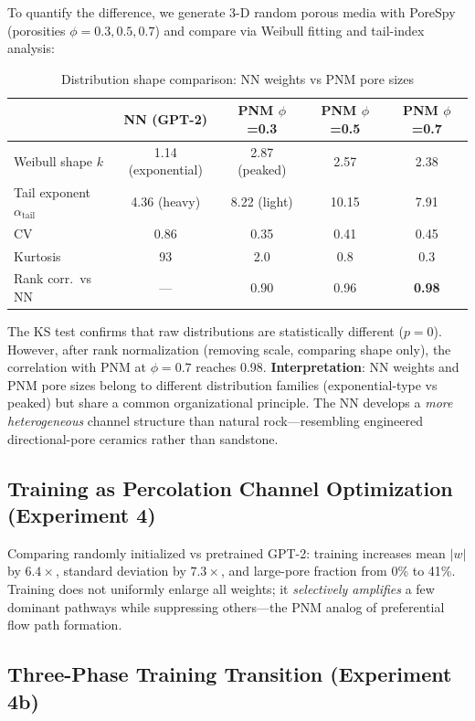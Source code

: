 \documentclass[11pt,a4paper]{article}
\begin{document}
To quantify the difference, we generate 3-D random porous media with
PoreSpy (porosities $\phi=0.3,0.5,0.7$) and compare via Weibull fitting
and tail-index analysis:

\begin{table}[H]
\centering
\caption{Distribution shape comparison: NN weights vs PNM pore sizes}
\label{tab:mis-shape}
\small
\begin{tabular}{lcccc}
\toprule
 & \textbf{NN (GPT-2)} & \textbf{PNM $\phi$=0.3} & \textbf{PNM $\phi$=0.5} & \textbf{PNM $\phi$=0.7} \\
\midrule
Weibull shape $k$ & 1.14 (exponential) & 2.87 (peaked) & 2.57 & 2.38 \\
Tail exponent $\alpha_{\text{tail}}$ & 4.36 (heavy) & 8.22 (light) & 10.15 & 7.91 \\
CV & 0.86 & 0.35 & 0.41 & 0.45 \\
Kurtosis & 93 & 2.0 & 0.8 & 0.3 \\
Rank corr.\ vs NN & --- & 0.90 & 0.96 & \textbf{0.98} \\
\bottomrule
\end{tabular}
\end{table}

The KS test confirms that raw distributions are statistically different
($p=0$). However, after rank normalization (removing scale, comparing
shape only), the correlation with PNM at $\phi=0.7$ reaches 0.98.
\textbf{Interpretation}: NN weights and PNM pore sizes belong to different
distribution families (exponential-type vs peaked) but share a common
organizational principle. The NN develops a \emph{more heterogeneous}
channel structure than natural rock---resembling engineered directional-pore
ceramics rather than sandstone.

\subsection{Training as Percolation Channel Optimization (Experiment 4)}

Comparing randomly initialized vs pretrained GPT-2: training increases mean
$|w|$ by $6.4\times$, standard deviation by $7.3\times$, and large-pore
fraction from 0\% to 41\%. Training does not uniformly enlarge all weights;
it \emph{selectively amplifies} a few dominant pathways while suppressing
others---the PNM analog of preferential flow path formation.

\subsection{Three-Phase Training Transition (Experiment 4b)}
\label{sec:three-phase}
\end{document}
